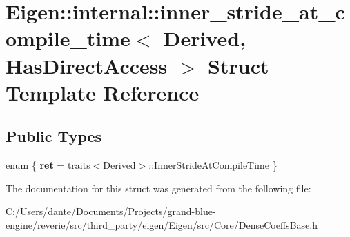 \hypertarget{struct_eigen_1_1internal_1_1inner__stride__at__compile__time}{}\section{Eigen\+::internal\+::inner\+\_\+stride\+\_\+at\+\_\+compile\+\_\+time$<$ Derived, Has\+Direct\+Access $>$ Struct Template Reference}
\label{struct_eigen_1_1internal_1_1inner__stride__at__compile__time}
\subsection*{Public Types}
\begin{DoxyCompactItemize}
\item 
\mbox{\label{struct_eigen_1_1internal_1_1inner__stride__at__compile__time_ab2517e55e73ac0af73f4145330b4a466}} 
enum \{ {\bfseries ret} = traits$<$Derived$>$\+::Inner\+Stride\+At\+Compile\+Time
 \}
\end{DoxyCompactItemize}


The documentation for this struct was generated from the following file\+:\begin{DoxyCompactItemize}
\item 
C\+:/\+Users/dante/\+Documents/\+Projects/grand-\/blue-\/engine/reverie/src/third\+\_\+party/eigen/\+Eigen/src/\+Core/Dense\+Coeffs\+Base.\+h\end{DoxyCompactItemize}

